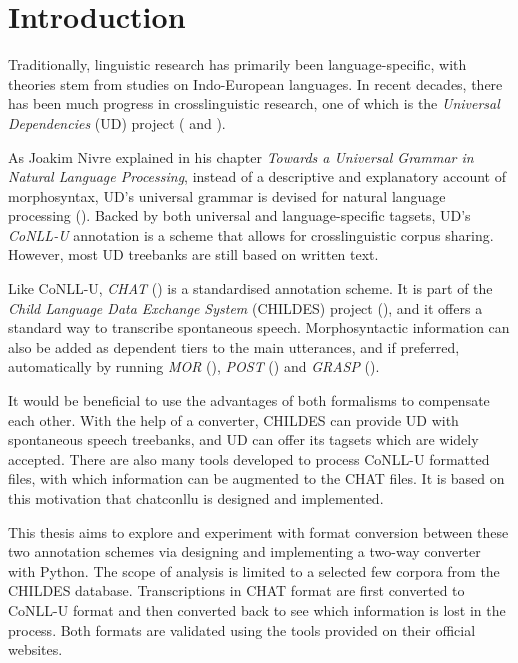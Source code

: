 \chapter{Introduction} %

\label{Chapter1} %

Traditionally, linguistic research has primarily been language-specific, with theories stem from studies on Indo-European languages. In recent decades, there has been much progress in crosslinguistic research, one of which is the \emph{Universal Dependencies} (UD) project (\cite{nivre2016} and \cite{nivre2020}).

As Joakim Nivre explained in his chapter \emph{Towards a Universal Grammar in Natural Language Processing}, instead of a descriptive and explanatory account of morphosyntax, UD's universal grammar is devised for natural language processing (\cite{nivre2015}). Backed by both universal and language-specific tagsets, UD's \emph{CoNLL-U} annotation is a scheme that allows for crosslinguistic corpus sharing. However, most UD treebanks are still based on written text.

Like CoNLL-U, \emph{CHAT} (\cite{Macwhinney2000}) is a standardised annotation scheme. It is part of the \emph{Child Language Data Exchange System} (CHILDES) project (\cite{Macwhinney2000}), and it offers a standard way to transcribe spontaneous speech. Morphosyntactic information can also be added as dependent tiers to the main utterances, and if preferred, automatically by running \emph{MOR} (\cite{Macwhinney2000}), \emph{POST} (\cite{parisse2000}) and \emph{GRASP} (\cite{Sagae2004}).

It would be beneficial to use the advantages of both formalisms to compensate each other. With the help of a converter, CHILDES can provide UD with spontaneous speech treebanks, and UD can offer its tagsets which are widely accepted. There are also many tools developed to process CoNLL-U formatted files, with which information can be augmented to the CHAT files. It is based on this motivation that chatconllu is designed and implemented.

This thesis aims to explore and experiment with format conversion between these two annotation schemes via designing and implementing a two-way converter with Python. The scope of analysis is limited to a selected few corpora from the CHILDES database. Transcriptions in CHAT format are first converted to CoNLL-U format and then converted back to see which information is lost in the process. Both formats are validated using the tools provided on their official websites.

